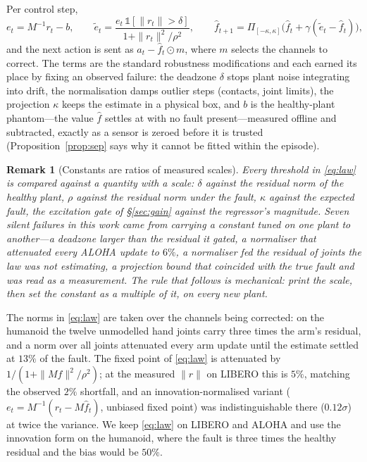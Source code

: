\documentclass{article}
\newtheorem{remark}{Remark}
\newcommand{\fhat}{\hat{f}}
\begin{document}
Per control step,
\begin{equation}
\label{eq:law}
e_t = M^{-1} r_t - b,\qquad
\tilde e_t = \frac{e_t\,\mathbb{1}[\|r_t\|>\delta]}{1+\|r_t\|^2/\rho^2},\qquad
\fhat_{t+1} = \Pi_{[-\kappa,\kappa]}\!\big(\fhat_t + \gamma(\tilde e_t - \fhat_t)\big),
\end{equation}
and the next action is sent as $a_t - \fhat_t \odot m$, where $m$ selects the channels to
correct. The terms are the standard robustness modifications and each earned its place by
fixing an observed failure: the deadzone $\delta$ stops plant noise integrating into drift,
the normalisation damps outlier steps (contacts, joint limits), the projection $\kappa$ keeps
the estimate in a physical box, and $b$ is the healthy-plant phantom---the value $\fhat$
settles at with no fault present---measured offline and subtracted, exactly as a sensor is
zeroed before it is trusted (Proposition~\ref{prop:sep} says why it cannot be fitted
within the episode).

\begin{remark}[Constants are ratios of measured scales]
\label{rem:scale}
Every threshold in \eqref{eq:law} is compared against a quantity with a scale: $\delta$
against the residual norm of the healthy plant, $\rho$ against the residual norm under the
fault, $\kappa$ against the expected fault, the excitation gate of \S\ref{sec:gain} against
the regressor's magnitude. Seven silent failures in this work came from carrying a constant
tuned on one plant to another---a deadzone larger than the residual it gated, a normaliser
that attenuated every ALOHA update to $6\%$, a normaliser fed the residual of joints the law
was not estimating, a projection bound that coincided with the true fault and was read as a
measurement. The rule that follows is mechanical: print the scale,
then set the constant as a multiple of it, on every new plant.
\end{remark}

The norms in \eqref{eq:law} are taken over the channels being corrected: on the humanoid
the twelve unmodelled hand joints carry three times the arm's residual, and a norm over all
joints attenuated every arm update until the estimate settled at $13\%$ of the fault. The
fixed point of \eqref{eq:law} is attenuated by $1/(1+\|Mf\|^2/\rho^2)$; at the measured
$\|r\|$ on LIBERO this is $5\%$, matching the observed $2\%$ shortfall, and an
innovation-normalised variant ($e_t = M^{-1}(r_t - M\fhat_t)$, unbiased fixed point) was
indistinguishable there ($0.12\sigma$) at twice the variance. We keep \eqref{eq:law} on
LIBERO and ALOHA and use the innovation form on the humanoid, where the fault is three
times the healthy residual and the bias would be $50\%$.
\end{document}
